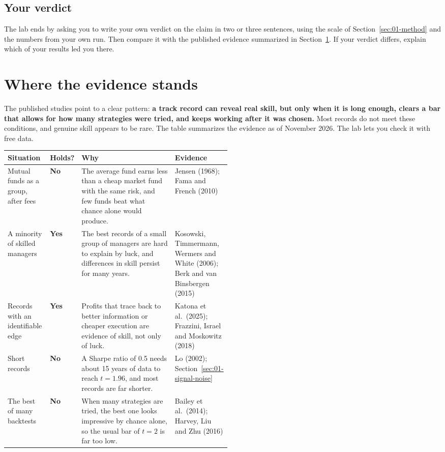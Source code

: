 \subsection*{Your verdict}

The lab ends by asking you to write your own verdict on the claim in two or three sentences, using the scale of Section~\ref{sec:01-method} and the numbers from your own run. Then compare it with the published evidence summarized in Section~\ref{sec:01-verdict}. If your verdict differs, explain which of your results led you there.

\section{Where the evidence stands}
\label{sec:01-verdict}

The published studies point to a clear pattern: \textbf{a track record can reveal real skill, but only when it is long enough, clears a bar that allows for how many strategies were tried, and keeps working after it was chosen.} Most records do not meet these conditions, and genuine skill appears to be rare. The table summarizes the evidence as of November 2026. The lab lets you check it with free data.

\begin{center}
\small
\begin{tabularx}{\linewidth}{@{}>{\raggedright\arraybackslash}p{0.19\linewidth}>{\raggedright\arraybackslash}p{0.10\linewidth}>{\raggedright\arraybackslash}X>{\raggedright\arraybackslash}p{0.22\linewidth}@{}}
\toprule
Situation & Holds? & Why & Evidence \\
\midrule
Mutual funds as a group, after fees & \textbf{No} & The average fund earns less than a cheap market fund with the same risk, and few funds beat what chance alone would produce. & Jensen (1968); Fama and French (2010) \\
A minority of skilled managers & \textbf{Yes} & The best records of a small group of managers are hard to explain by luck, and differences in skill persist for many years. & Kosowski, Timmermann, Wermers and White (2006); Berk and van Binsbergen (2015) \\
Records with an identifiable edge & \textbf{Yes} & Profits that trace back to better information or cheaper execution are evidence of skill, not only of luck. & Katona et al.\ (2025); Frazzini, Israel and Moskowitz (2018) \\
Short records & \textbf{No} & A Sharpe ratio of 0.5 needs about 15 years of data to reach $t = 1.96$, and most records are far shorter. & Lo (2002); Section~\ref{sec:01-signal-noise} \\
The best of many backtests & \textbf{No} & When many strategies are tried, the best one looks impressive by chance alone, so the usual bar of $t = 2$ is far too low. & Bailey et al.\ (2014); Harvey, Liu and Zhu (2016) \\
\bottomrule
\end{tabularx}
\end{center}

